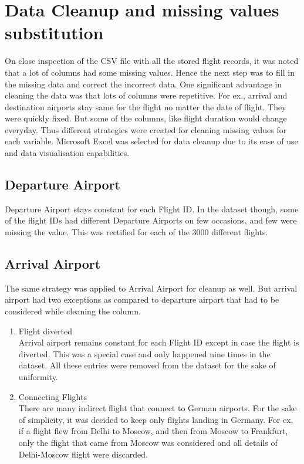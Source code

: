 \section{Data Cleanup and missing values substitution}
On close inspection of the CSV file with all the stored flight records, it was noted that a lot of columns had some missing values. Hence the next step was to fill in the missing data and correct the incorrect data. One significant advantage in cleaning the data was that lots of columns were repetitive. For ex., arrival and destination airports stay same for the flight no matter the date of flight. They were quickly fixed. But some of the columns, like flight duration would change everyday. Thus different strategies were created for cleaning missing values for each variable. Microsoft Excel was selected for data cleanup due to its ease of use and data visualisation capabilities.

\subsection{Departure Airport}
Departure Airport stays constant for each Flight ID. In the dataset though, some of the flight IDs had different Departure Airports on few occasions, and few were missing the value. This was rectified for each of the 3000 different flights.

\subsection{Arrival Airport}
The same strategy was applied to Arrival Airport for cleanup as well. But arrival airport had two exceptions as compared to departure airport that had to be considered while cleaning the column.
\begin{enumerate}
    \item Flight diverted
    \\Arrival airport remains constant for each Flight ID except in case the flight is diverted. This was a special case and only happened nine times in the dataset. All these entries were removed from the dataset for the sake of uniformity.
    \item Connecting Flights
    \\There are many indirect flight that connect to German airports. For the sake of simplicity, it was decided to keep only flights landing in Germany. For ex, if a flight flew from Delhi to Moscow, and then from Moscow to Frankfurt, only the flight that came from Moscow was considered and all details of Delhi-Moscow flight were discarded. 
\end{enumerate} 

